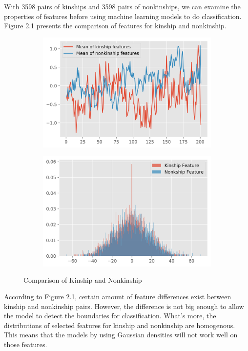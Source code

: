 \documentclass[12pt]{article}
\theoremstyle{definition}
\numberwithin{equation}{section}
\numberwithin{figure}{section}
\numberwithin{table}{section}
\begin{document}
With 3598 pairs of kinships and 3598 pairs of nonkinships, we can examine the properties of features before using machine learning models to do classification. Figure 2.1 presents the comparison of features for kinship and nonkinship. 
\begin{figure}[H]
  \centering
  \begin{subfigure}[b]{0.49\textwidth}
    \centering
    \includegraphics[width=\textwidth]{meanfeatures}
  \end{subfigure}
  \begin{subfigure}[b]{0.49\textwidth}
    \centering
    \includegraphics[width=\textwidth]{histfeatures}
  \end{subfigure}
  \caption{Comparison of Kinship and Nonkinship}
\end{figure}
According to Figure 2.1, certain amount of feature differences exist between kinship and nonkinship pairs. However, the difference is not big enough to allow the model to detect the boundaries for classification. What's more, the distributions of selected features for kinship and nonkinship are homogenous. This means that the models by using Gaussian densities will not work well on those features.
\end{document}
